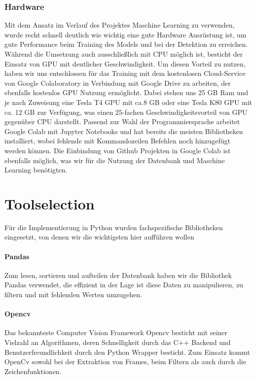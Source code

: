 \subsubsection*{Hardware}
Mit dem Ansatz im Verlauf des Projektes Maschine Learning zu verwenden, wurde recht schnell deutlich wie wichtig eine gute Hardware Ausrüstung ist, um gute Performance beim Training des Models und bei der Detektion zu erreichen. Während die Umsetzung auch ausschließlich mit CPU möglich ist, besticht der Einsatz von GPU mit deutlicher Geschwindigkeit. Um diesen Vorteil zu nutzen, haben wir uns entschlossen für das Training mit dem kostenlosen Cloud-Service von Google Colaboratory in Verbindung mit Google Drive zu arbeiten, der ebenfalls kostenlos GPU Nutzung ermöglicht. Dabei stehen uns 25 GB Ram und je nach Zuweisung eine Tesla T4 GPU mit ca.8 GB oder eine Tesla K80 GPU mit ca. 12 GB zur Verfügung, was einen 25-fachen Geschwindigkeitsvorteil von GPU gegenüber CPU darstellt. Passend zur Wahl der Programmiersprache arbeitet Google Colab mit Jupyter Notebooks und hat bereits die meisten Bibliotheken installiert, wobei fehlende mit Kommandozeilen Befehlen noch hinzugefügt werden können. Die Einbindung von Github Projekten in Google Colab ist ebenfalls möglich, was wir für die Nutzung der Datenbank und Maschine Learning benötigten.

\section{Toolselection}
Für die Implementierung in Python wurden fachspezifische Bibliotheken eingesetzt, von denen wir die wichtigsten hier aufführen wollen
\paragraph{Pandas}
Zum lesen, sortieren und aufteilen der Datenbank haben wir die Bibliothek Pandas verwendet, die effizient in der Lage ist diese Daten zu manipulieren, zu filtern und mit fehlenden Werten umzugehen.

\paragraph{Opencv}
Das bekannteste Computer Vision Framework Opencv besticht mit seiner Vielzahl an Algorithmen, deren Schnelligkeit durch das C++ Backend und Benutzerfreundlichkeit durch den Python Wrapper besticht. Zum Einsatz kommt OpenCv sowohl bei der Extraktion von Frames, beim Filtern als auch durch die Zeichenfunktionen.

